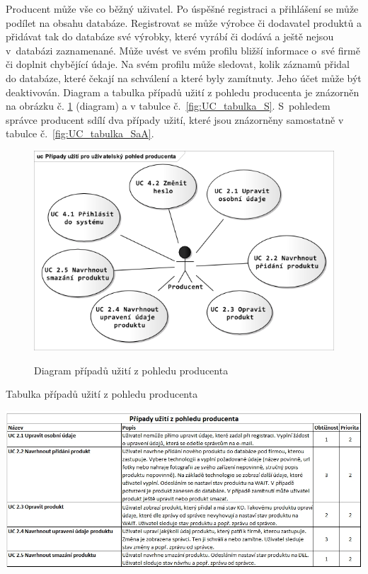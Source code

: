 \documentclass[11pt,a4paper]{article}
\newcounter{subsubsubsection}
\begin{document}
Producent může vše co běžný uživatel. Po úspěšné registraci a  přihlášení se může podílet na obsahu databáze. Registrovat se může výrobce či dodavatel produktů a přidávat tak do databáze své výrobky, které vyrábí či dodává a ještě nejsou v~databázi zaznamenané. Může uvést ve svém profilu bližší informace o~své firmě či doplnit chybějící údaje. Na svém profilu může sledovat, kolik záznamů přidal do databáze, které čekají na schválení a které byly zamítnuty. Jeho účet může být deaktivován. Diagram a tabulka případů užití z pohledu producenta je znázorněn na obrázku č. \ref{fig:UC_diagram_S} (diagram) a v tabulce č.~\ref{fig:UC_tabulka_S}. S~pohledem správce producent sdílí dva případy užití, které jsou znázorněny samostatně v tabulce č.~\ref{fig:UC_tabulka_SaA}. 

\begin{figure}[H] 
\centering 
\caption{Diagram případů užití z pohledu producenta} 
\vspace{0.1cm} 
\includegraphics[scale=0.8]{vize_DTOZE_UC_dg2_n} 
\label{fig:UC_diagram_S}
\end{figure} 

\begin{table}[H] 
\centering 
\caption{Tabulka případů užití z pohledu producenta} 
\includegraphics[scale=0.5]{vize_DTOZE_UC_2} 
\label{fig:UC_tabulka_S}
\end{table} 
\end{document}
